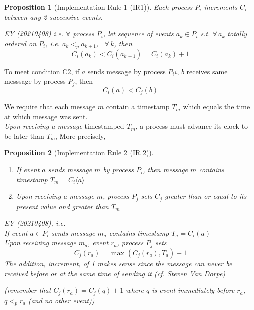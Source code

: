 \documentclass[10pt]{amsart}
\newtheorem{proposition}{Proposition}
\begin{document}
\begin{multicols*}{2}
\begin{proposition}[Implementation Rule 1 (IR1)]\label{IR1}
Each process $P_i$ increments $C_i$ between any 2 successive events.

EY (20210408) i.e. $\forall $ process $P_i$, let sequence of events $a_k \in P_i$ s.t. $\forall \, a_k$ totally ordered on $P_i$, i.e. $a_k <_p a_{k+1}$, \, $\forall \, k$, then
\begin{equation}
\boxed{ 
	C_i(a_k) < C_i(a_{k+1}) = C_i(a_k) + 1 }
\end{equation}
\end{proposition} 

To meet condition C2, if $a$ sends message by process $P_ii$, $b$ receives same messsage by process $P_j$, then 
\[
C_i(a) < C_j(b)
\]

We require that each message $m$ contain a timestamp $T_m$ which equals the time at which message was sent.\\
\emph{Upon receiving a message} timestamped $T_m$, a process must advance its clock to be later than $T_m$, More precisely,

\begin{proposition}[Implementation Rule 2 (IR 2)]
\begin{enumerate}
	\item If event $a$ sends message $m$ by process $P_i$, then message $m$ contains timestamp $T_m = C_i\langle a \rangle$
	\item Upon receiving a message $m$, process $P_j$ sets $C_j$ greater than or equal to its present value and greater than $T_m$
\end{enumerate}

EY (20210408), i.e. \\

If event $ a\in P_i$ sends message $m_a$ contains timestamp $T_a = C_i(a)$ \\
Upon receiving message $m_a$, event $r_a$, process $P_j$ sets 
\begin{equation}
\boxed{
	C_j(r_a) = \max{ (C_j(r_a), T_a)} + 1
}
\end{equation} 
The addition, increment, of 1 makes sense since the message can never be received before or at the same time of sending it (cf. \href{https://towardsdatascience.com/understanding-lamport-timestamps-with-pythons-multiprocessing-library-12a6427881c6}{Steven Van Dorpe})

(remember that $C_j(r_a) = C_j(q) + 1$ where $q$ is event immediately before $r_a$, $q <_p r_a$ (and no other event))


\end{proposition}
\end{multicols*}
\end{document}
